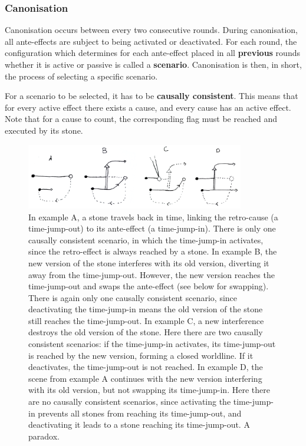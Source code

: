 \documentclass[12pt]{article}
\begin{document}
	\subsubsection{Canonisation}\label{sec:canonisation}
	Canonisation occurs between every two consecutive rounds. During canonisation, all ante-effects are subject to being activated or deactivated. For each round, the configuration which determines for each ante-effect placed in all \textbf{previous} rounds whether it is active or passive is called a \textbf{scenario}. Canonisation is then, in short, the process of selecting a specific scenario.
	
	For a scenario to be selected, it has to be \textbf{causally consistent}. This means that for every active effect there exists a cause, and every cause has an active effect. Note that for a cause to count, the corresponding flag must be reached and executed by its stone.
	
	\begin{figure}[h]
\begin{center}
    \includegraphics[width=0.85\textwidth]{images/diag_canonisation}
 \caption{In example A, a stone travels back in time, linking the retro-cause (a time-jump-out) to its ante-effect (a time-jump-in). There is only one causally consistent scenario, in which the time-jump-in activates, since the retro-effect is always reached by a stone. In example B, the new version of the stone interferes with its old version, diverting it away from the time-jump-out. However, the new version reaches the time-jump-out and swaps the ante-effect (see below for swapping). There is again only one causally consistent scenario, since deactivating the time-jump-in means the old version of the stone still reaches the time-jump-out. In example C, a new interference destroys the old version of the stone. Here there are two causally consistent scenarios: if the time-jump-in activates, its time-jump-out is reached by the new version, forming a closed worldline. If it deactivates, the time-jump-out is not reached. In example D, the scene from example A continues with the new version interfering with its old version, but not swapping its time-jump-in. Here there are no causally consistent scenarios, since activating the time-jump-in prevents all stones from reaching its time-jump-out, and deactivating it leads to a stone reaching its time-jump-out. A paradox.}\label{fig:canonisation}
\end{center}
\end{figure}
	
\end{document}
